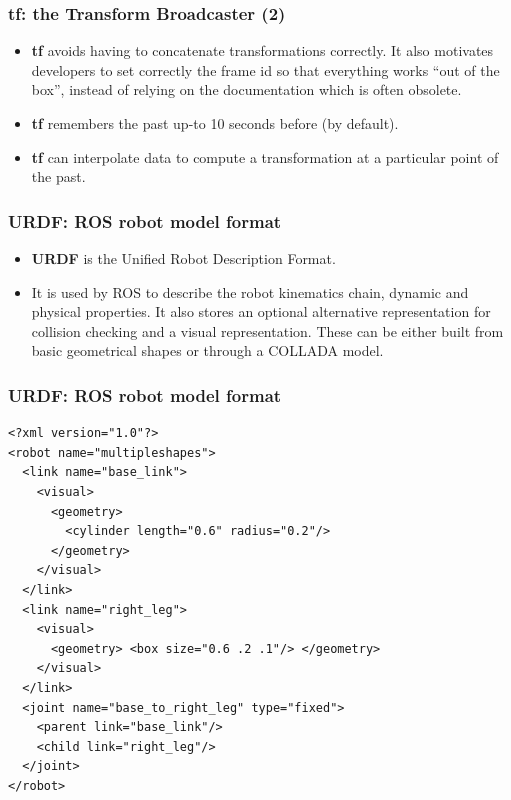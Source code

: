 \documentclass[hyperref={pdfpagelabels=false}]{beamer}
\newenvironment{changemargin}[2]{%
\begin{list}{}{%
\setlength{\topsep}{0pt}%
\setlength{\leftmargin}{#1}%
\setlength{\rightmargin}{#2}%
\setlength{\listparindent}{\parindent}%
\setlength{\itemindent}{\parindent}%
\setlength{\parsep}{\parskip}%
}%
\item[]}{\end{list}}
\begin{document}
\begin{frame}[fragile]
  \frametitle{tf: the Transform Broadcaster (2)}

  \begin{itemize}
  \item \textbf{tf} avoids having to concatenate transformations
    correctly. It also motivates developers to set correctly the frame
    id so that everything works ``out of the box'', instead of relying
    on the documentation which is often obsolete.
  \item \textbf{tf} remembers the past up-to 10 seconds before (by
    default).
  \item \textbf{tf} can interpolate data to compute a transformation at
    a particular point of the past.
  \end{itemize}

\end{frame}

\begin{frame}[fragile]
  \frametitle{URDF: ROS robot model format}

  \begin{itemize}
  \item \textbf{URDF} is the Unified Robot Description Format.
  \item It is used by ROS to describe the robot kinematics chain,
    dynamic and physical properties. It also stores an optional
    alternative representation for collision checking and a visual
    representation. These can be either built from basic geometrical
    shapes or through a COLLADA model.
  \end{itemize}
\end{frame}

\begin{frame}[fragile]
  \frametitle{URDF: ROS robot model format}

\begin{changemargin}{0cm}{-1cm}
  \footnotesize
  \begin{verbatim}
<?xml version="1.0"?>
<robot name="multipleshapes">
  <link name="base_link">
    <visual>
      <geometry>
        <cylinder length="0.6" radius="0.2"/>
      </geometry>
    </visual>
  </link>
  <link name="right_leg">
    <visual>
      <geometry> <box size="0.6 .2 .1"/> </geometry>
    </visual>
  </link>
  <joint name="base_to_right_leg" type="fixed">
    <parent link="base_link"/>
    <child link="right_leg"/>
  </joint>
</robot>
  \end{verbatim}
\end{changemargin}
\end{frame}
\end{document}
